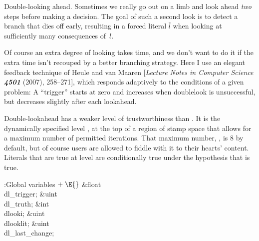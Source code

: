 Double-looking ahead. Sometimes we really go out on a
limb and
look ahead {\it two\/} steps before making a decision. The goal of such a
second look is to detect a branch that dies off early, resulting
in a forced literal $\bar l$ when looking at sufficiently many consequences
of~$l$.

Of course an extra degree of looking takes time, and we don't want to
do it if the extra time isn't recouped by a better branching strategy.
Here I use an elegant feedback technique of Heule and van Maaren
[{\sl Lecture Notes in Computer Science\/ \bf4501} (2007), 258--271],
which responds adaptively to the conditions of a given problem:
A ``trigger'' starts at zero and increases when doublelook is unsuccessful,
but decreases slightly after each lookahead.

Double-lookahead has a weaker level of trustworthiness than
. It is the dynamically specified level , at the
top of a region of stamp space that allows for a maximum number of
permitted iterations. That maximum number, , is 8 by
default,
but of course users are allowed to fiddle with it to their hearts' content.
Literals that are true at level  are conditionally true under
the
hypothesis that  is true.

\Y\B\4:Global variables\X${}\mathrel+\E{}$\6
\&{float} \\{dl\_trigger};\6
\&{uint} \\{dl\_truth};\6
\&{int} \\{dlooki};\6
\&{uint} \\{dlooklit};\6
\&{uint} \\{dl\_last\_change};\par
\fi

